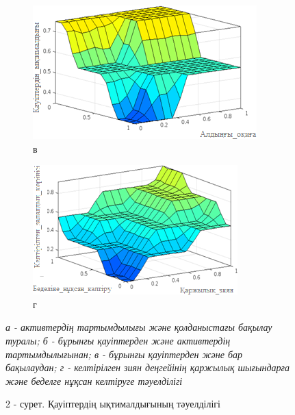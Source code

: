 \begin{figure}[H]
    \centering
    \begin{subfigure}{0.45\textwidth}
        \centering
        \includegraphics[width=\linewidth]{media/ict/image29}
        \caption*{в}
    \end{subfigure}
    \hfill
    \begin{subfigure}{0.45\textwidth}
        \centering
        \includegraphics[width=\linewidth]{media/ict/image30}
        \caption*{г}
    \end{subfigure}
    \caption*{\normalfont\emph{а - активтердің тартымдылығы және қолданыстағы бақылау туралы; б -
бұрынғы қауіптерден және активтердің тартымдылығынан; в - бұрынғы
қауіптерден және бар бақылаудан; г - келтірілген зиян деңгейінің
қаржылық шығындарға және беделге нұқсан келтіруге тәуелділігі}}
    \caption*{2 - сурет. Қауіптердің ықтималдығының тәуелділігі}
\end{figure}

